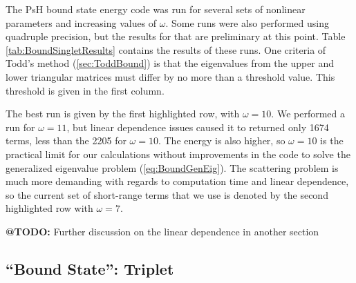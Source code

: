 \documentclass[Dissertation.tex]{subfiles}
\begin{document}
The PsH bound state energy code was run for several sets of nonlinear parameters and increasing values of $\omega$.  Some runs were also performed using quadruple precision, but the results for that are preliminary at this point.  Table \ref{tab:BoundSingletResults} contains the results of these runs.  One criteria of Todd's method (\ref{sec:ToddBound}) is that the eigenvalues from the upper and lower triangular matrices must differ by no more than a threshold value.  This threshold is given in the first column.

The best run is given by the first highlighted row, with $\omega = 10$.  We performed a run for $\omega = 11$, but linear dependence issues caused it to returned only 1674 terms, less than the 2205 for $\omega = 10$.  The energy is also higher, so $\omega = 10$ is the practical limit for our calculations without improvements in the code to solve the generalized eigenvalue problem (\ref{eq:BoundGenEig}).  The scattering problem is much more demanding with regards to computation time and linear dependence, so the current set of short-range terms that we use is denoted by the second highlighted row with $\omega = 7$.  

\textbf{@TODO:} Further discussion on the linear dependence in another section



\subsection{``Bound State'': Triplet}
\end{document}
